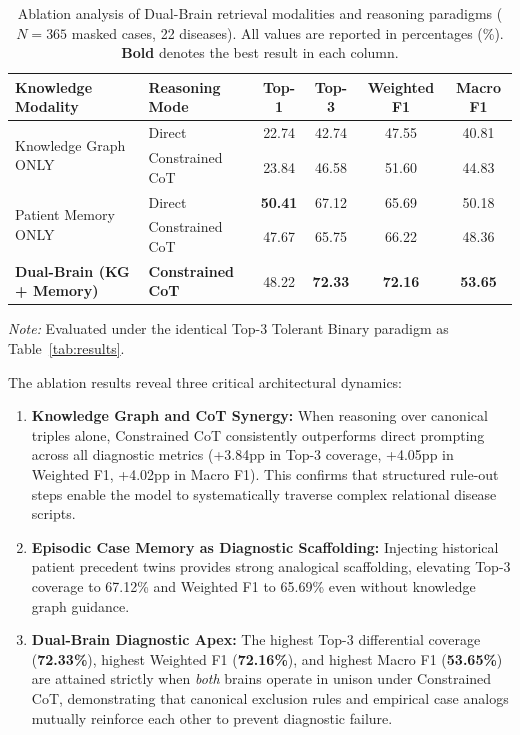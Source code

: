 \documentclass{article}
\begin{document}
\begin{table}[H]
\centering
\caption{Ablation analysis of Dual-Brain retrieval modalities and reasoning paradigms ($N = 365$ masked cases, 22 diseases). All values are reported in percentages (\%). \textbf{Bold} denotes the best result in each column.}
\label{tab:ablation}
\small
\setlength{\tabcolsep}{8pt}
\begin{tabular}{@{}ll cccc@{}}
\toprule
\textbf{Knowledge Modality} & \textbf{Reasoning Mode} & \textbf{Top-1} & \textbf{Top-3} & \textbf{Weighted F1} & \textbf{Macro F1} \\
\midrule
\multirow{2}{*}{Knowledge Graph ONLY} & Direct & 22.74 & 42.74 & 47.55 & 40.81 \\
 & Constrained CoT & 23.84 & 46.58 & 51.60 & 44.83 \\
\midrule
\multirow{2}{*}{Patient Memory ONLY} & Direct & \textbf{50.41} & 67.12 & 65.69 & 50.18 \\
 & Constrained CoT & 47.67 & 65.75 & 66.22 & 48.36 \\
\midrule
\textbf{Dual-Brain (KG + Memory)} & \textbf{Constrained CoT} & 48.22 & \textbf{72.33} & \textbf{72.16} & \textbf{53.65} \\
\bottomrule
\end{tabular}

\vspace{4pt}
{\footnotesize \emph{Note:} Evaluated under the identical Top-3 Tolerant Binary paradigm as Table~\ref{tab:results}.}
\end{table}

The ablation results reveal three critical architectural dynamics:
\begin{enumerate}[noitemsep, leftmargin=*]
    \item \textbf{Knowledge Graph and CoT Synergy:} When reasoning over canonical triples alone, Constrained CoT consistently outperforms direct prompting across all diagnostic metrics (+3.84pp in Top-3 coverage, +4.05pp in Weighted F1, +4.02pp in Macro F1). This confirms that structured rule-out steps enable the model to systematically traverse complex relational disease scripts.
    \item \textbf{Episodic Case Memory as Diagnostic Scaffolding:} Injecting historical patient precedent twins provides strong analogical scaffolding, elevating Top-3 coverage to 67.12\% and Weighted F1 to 65.69\% even without knowledge graph guidance.
    \item \textbf{Dual-Brain Diagnostic Apex:} The highest Top-3 differential coverage (\textbf{72.33\%}), highest Weighted F1 (\textbf{72.16\%}), and highest Macro F1 (\textbf{53.65\%}) are attained strictly when \emph{both} brains operate in unison under Constrained CoT, demonstrating that canonical exclusion rules and empirical case analogs mutually reinforce each other to prevent diagnostic failure.
\end{enumerate}
\end{document}
